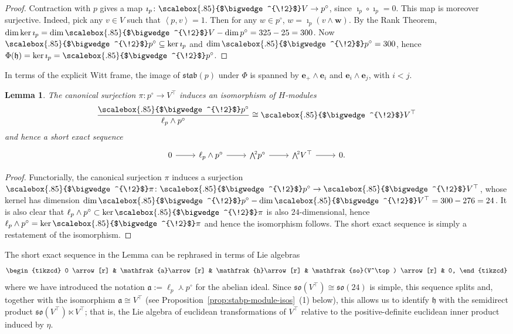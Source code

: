 \documentclass[11pt,reqno,a4paper,final]{amsart}
\newcommand\ext[1]{\scalebox{.85}{$\bigwedge^{\!#1}$}}
\theoremstyle{plain}
\newtheorem{lemma}{Lemma}
\theoremstyle{definition}
\newcommand{\h}{\mathfrak{h}}
\newcommand{\fa}{\mathfrak{a}}
\newcommand{\so}{\mathfrak{so}}
\newcommand{\be}{\boldsymbol{e}}
\newcommand{\w}{\boldsymbol{w}}
\newcommand{\stab}{\mathfrak{stab}}
\newcommand{\1}{\mathbb{1}}
\numberwithin{equation}{section}
\begin{document}
\begin{proof}
  Contraction with $p$ gives a map $\imath_p \colon \ext{2} V \to
  p^\circ$, since $\imath_p \circ \imath_p = 0$.  This map is moreover
  surjective.  Indeed, pick any $v \in V$ such that
  $\left<p,v\right> = 1$.  Then for any $w \in p^\circ$, $w = \imath_p
  (v \wedge \w)$.  By the Rank Theorem, $\dim \ker \imath_p = \dim
  \ext{2} V - \dim p^\circ = 325 -25 = 300$.  Now $\ext{2} p^\circ
  \subseteq \ker \imath_p$ and $\dim \ext{2} p^\circ = 300$, hence
  $\Phi(\h) = \ker \imath_p = \ext{2}p^\circ$.
\end{proof}

In terms of the explicit Witt frame, the image of $\stab(p)$ under
$\Phi$ is spanned by $\be_+ \wedge \be_i$ and $\be_i \wedge \be_j$,
with $i < j$.

\begin{lemma}
  \label{lem:iso-h2rel-skewsymmetric}
  The canonical surjection $\pi : p^\circ \to V^\top$ induces an
  isomorphism of $H$-modules
  \begin{equation}
    \dfrac{\ext{2}p^\circ}{\ell_p \wedge p^\circ} \cong \ext{2}V^\top
  \end{equation}
  and hence a short exact sequence
  \begin{equation}
    \begin{tikzcd}
      0 \arrow[r] & \ell_p \wedge p^\circ \arrow[r] & \ext{2}p^\circ \arrow[r] & \ext{2} V^\top \arrow[r] & 0.
    \end{tikzcd}
  \end{equation}
\end{lemma}

\begin{proof}
  Functorially, the canonical surjection $\pi$ induces a surjection
  $\ext{2}\pi \colon \ext{2}p^\circ \to \ext{2}V^\top$, whose kernel
  has dimension $\dim \ext{2}p^\circ - \dim \ext{2}V^\top = 300 - 276
  = 24$.  It is also clear that $\ell_p \wedge p^\circ \subset \ker
  \ext{2}\pi$ is also $24$-dimensional, hence $\ell_p \wedge p^\circ =
  \ker \ext{2}\pi$ and hence the isomorphism follows.  The short exact
  sequence is simply a restatement of the isomorphism.
\end{proof}

The short exact sequence in the Lemma can be rephrased in terms of Lie
algebras
\begin{equation}
  \label{eq:SES-stab-h-semidirect}
  \begin{tikzcd}
    0 \arrow[r] & \fa \arrow[r] & \h \arrow[r] & \so(V^\top) \arrow[r] & 0,
  \end{tikzcd}
\end{equation}
where we have introduced the notation $\fa := \ell_p \curlywedge
p^\circ$ for the abelian ideal.  Since $\so(V^\top) \cong \so(24)$ is
simple, this sequence splits and, together with the isomorphism $\fa \cong V^\top$
(see Proposition~\ref{prop:stabp-module-isos}~(1) below), this allows
us to identify $\h$ with the semidirect product $\so(V^\top)
\ltimes V^\top$; that is, the Lie algebra of euclidean transformations
of $V^\top$ relative to the positive-definite euclidean inner product
induced by $\eta$.
\end{document}
